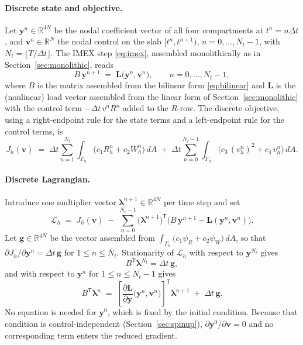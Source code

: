 \documentclass[11pt]{article}
\newcommand{\Lag}{\mathcal{L}}
\begin{document}
\paragraph{Discrete state and objective.} Let $\mathbf{y}^n\in\mathbb{R}^{4N}$ be the nodal coefficient vector of all four compartments at $t^n=n\Delta t$, and $\mathbf{v}^n\in\mathbb{R}^{N}$ the nodal control on the slab $[t^n,t^{n+1})$, $n=0,\dots,N_t-1$, with $N_t = \lfloor T/\Delta t\rfloor$. The IMEX step \eqref{eq:imex}, assembled monolithically as in Section~\ref{sec:monolithic}, reads
\begin{equation}
B\,\mathbf{y}^{n+1} \;=\; \mathbf{L}\big(\mathbf{y}^n,\mathbf{v}^n\big), \qquad n=0,\dots,N_t-1,
\label{eq:discrete-state}
\end{equation}
where $B$ is the matrix assembled from the bilinear form \eqref{eq:bilinear} and $\mathbf{L}$ is the (nonlinear) load vector assembled from the linear form of Section~\ref{sec:monolithic} with the control term $-\Delta t\,v^n R^n$ added to the $R$-row. The discrete objective, using a right-endpoint rule for the state terms and a left-endpoint rule for the control terms, is
\begin{equation}
J_h(\mathbf{v}) \;=\; \Delta t\sum_{n=1}^{N_t}\int_{\Gamma_h}\big(c_1 R_h^n + c_2 W_h^n\big)\,dA
\;+\; \Delta t\sum_{n=0}^{N_t-1}\int_{\Gamma_h} \big(c_3\,(v_h^n)^2 + c_4\,v_h^n\big)\,dA .
\label{eq:discrete-objective}
\end{equation}

\paragraph{Discrete Lagrangian.} Introduce one multiplier vector $\boldsymbol\lambda^{n+1}\in\mathbb{R}^{4N}$ per time step and set
\begin{equation}
\Lag_h \;=\; J_h(\mathbf{v}) \;-\; \sum_{n=0}^{N_t-1}\big(\boldsymbol\lambda^{n+1}\big)^{\mathsf T}\Big(B\,\mathbf{y}^{n+1} - \mathbf{L}(\mathbf{y}^n,\mathbf{v}^n)\Big).
\end{equation}
Let $\mathbf{g}\in\mathbb{R}^{4N}$ be the vector assembled from $\int_{\Gamma_h}\big(c_1\psi_R + c_2\psi_W\big)\,dA$, so that $\partial J_h/\partial \mathbf{y}^n = \Delta t\,\mathbf{g}$ for $1\le n\le N_t$. Stationarity of $\Lag_h$ with respect to $\mathbf{y}^{N_t}$ gives
\begin{equation}
B^{\mathsf T}\boldsymbol\lambda^{N_t} = \Delta t\,\mathbf{g},
\label{eq:discrete-terminal}
\end{equation}
and with respect to $\mathbf{y}^{n}$ for $1\le n\le N_t-1$ gives
\begin{equation}
B^{\mathsf T}\boldsymbol\lambda^{n} \;=\; \left[\frac{\partial \mathbf{L}}{\partial\mathbf{y}}\big(\mathbf{y}^n,\mathbf{v}^n\big)\right]^{\mathsf T}\boldsymbol\lambda^{n+1} \;+\; \Delta t\,\mathbf{g}.
\label{eq:discrete-adjoint}
\end{equation}
No equation is needed for $\mathbf{y}^0$, which is fixed by the initial condition. Because that condition is control-independent (Section~\ref{sec:spinup}), $\partial\mathbf{y}^0/\partial\mathbf{v}=0$ and no corresponding term enters the reduced gradient.
\end{document}
